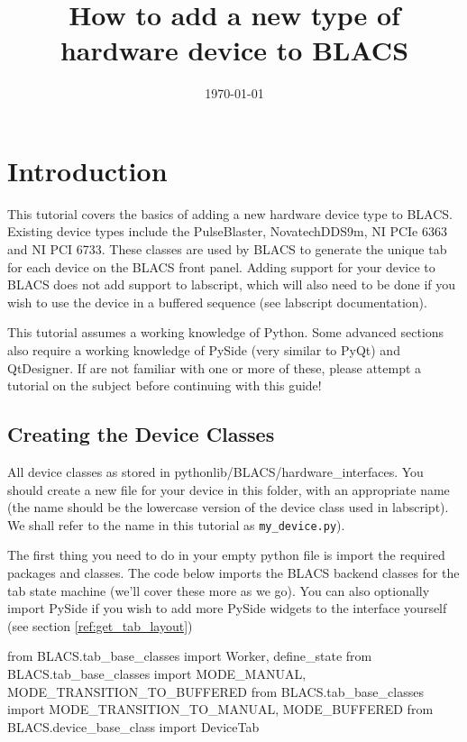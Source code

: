 \documentclass[12pt]{article}
\begin{document}
\title{How to add a new type of hardware device to BLACS}
\date{\today}
\maketitle
\newpage
\tableofcontents
\newpage
{}
\section{Introduction}
This tutorial covers the basics of adding a new hardware device type to BLACS. 
Existing device types include the PulseBlaster, NovatechDDS9m, NI PCIe 6363 and NI PCI 6733. 
These classes are used by BLACS to generate the unique tab for each device on the BLACS front panel. 
Adding support for your device to BLACS does not add support to labscript, which will also need to be done if you wish to use the device in a buffered sequence (see labscript documentation). 

This tutorial assumes a working knowledge of Python. 
Some advanced sections also require a working knowledge of PySide (very similar to PyQt) and QtDesigner. 
If are not familiar with one or more of these, please attempt a tutorial on the subject before continuing with this guide!

\subsection{Creating the Device Classes}\label{creating class}
All device classes as stored in pythonlib/BLACS/hardware\_interfaces. 
You should create a new file for your device in this folder, with an appropriate name (the name should be the lowercase version of the device class used in labscript). 
We shall refer to the name in this tutorial as \texttt{my\_device.py}).

The first thing you need to do in your empty python file is import the required packages and classes.
The code below imports the BLACS backend classes for the tab state machine (we'll cover these more as we go).
You can also optionally import PySide if you wish to add more PySide widgets to the interface yourself (see section \ref{ref:get_tab_layout})
\begin{python}
from BLACS.tab_base_classes import Worker, define_state
from BLACS.tab_base_classes import MODE_MANUAL, MODE_TRANSITION_TO_BUFFERED
from BLACS.tab_base_classes import MODE_TRANSITION_TO_MANUAL, MODE_BUFFERED  
from BLACS.device_base_class import DeviceTab
\end{python}
\end{document}
